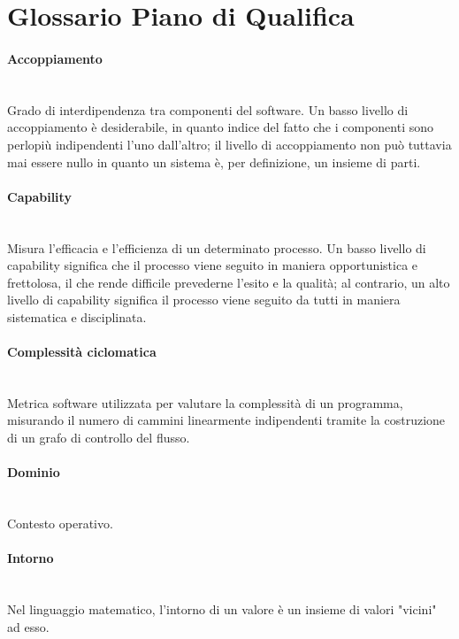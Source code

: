 \section{Glossario Piano di Qualifica}

\paragraph{Accoppiamento}~\smallskip \\
Grado di interdipendenza tra componenti del software. Un basso livello di accoppiamento è desiderabile, in quanto indice del fatto che i componenti sono perlopiù indipendenti l'uno dall'altro; il livello di accoppiamento non può tuttavia mai essere nullo in quanto un sistema è, per definizione, un insieme di parti.

\paragraph{Capability}~\smallskip \\
Misura l'efficacia e l'efficienza di un determinato processo. Un basso livello di capability significa che il processo viene seguito in maniera opportunistica e frettolosa, il che rende difficile prevederne l'esito e la qualità; al contrario, un alto livello di capability significa il processo viene seguito da tutti in maniera sistematica e disciplinata.

\paragraph{Complessità ciclomatica}~\smallskip \\
Metrica software utilizzata per valutare la complessità di un programma, misurando il numero di cammini linearmente indipendenti tramite la costruzione di un grafo di controllo del flusso.

\paragraph{Dominio}~\smallskip \\
Contesto operativo.

\paragraph{Intorno}~\smallskip \\
Nel linguaggio matematico, l'intorno di un valore è un insieme di valori "vicini" ad esso.

